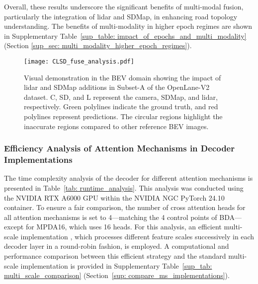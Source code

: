 Overall, these results underscore the significant benefits of multi-modal fusion, particularly the integration of lidar and SDMap, in enhancing road topology understanding. The benefits of multi-modality in higher epoch regimes are shown in Supplementary Table~\ref{sup_table: impact_of_epochs_and_multi_modality} (Section \ref{sup_sec: multi_modality_higher_epoch_regimes}). 

\begin{figure}[tb]
  \centering
  \texttt{[image: CLSD\_fuse\_analysis.pdf]}
  \caption{Visual demonstration in the BEV domain showing the impact of lidar and SDMap additions in Subset-A of the OpenLane-V2 dataset. C, SD, and L represent the camera, SDMap, and lidar, respectively. Green polylines indicate the ground truth, and red polylines represent predictions. The circular regions highlight the inaccurate regions compared to other reference BEV images.}
  \label{fig: clsd_fuse_analysis}
\end{figure}

\subsubsection{Efficiency Analysis of Attention Mechanisms in Decoder Implementations}
\label{sec: exp_efficiency_analysis}

\begin{table}[t]
\centering
\caption{Decoder runtimes (in ms) for different attention types in Torch and ONNX. ONNX* indicates inference without auxiliary mask heads.}
\label{tab: runtime_analysis}
\end{table}

The time complexity analysis of the decoder for different attention mechanisms is presented in Table~\ref{tab: runtime_analysis}. This analysis was conducted using the NVIDIA RTX A6000 GPU within the NVIDIA NGC PyTorch 24.10 container. To ensure a fair comparison, the number of cross attention heads for all attention mechanisms is set to 4—matching the 4 control points of BDA—except for MPDA16, which uses 16 heads. For this analysis, an efficient multi-scale implementation \cite{cheng2022masked}, which processes different feature scales successively in each decoder layer in a round-robin fashion, is employed. A computational and performance comparison between this efficient strategy and the standard multi-scale implementation is provided in Supplementary Table~\ref{sup_tab: multi_scale_comparison} (Section~\ref{sup: compare_ms_implementations}).

